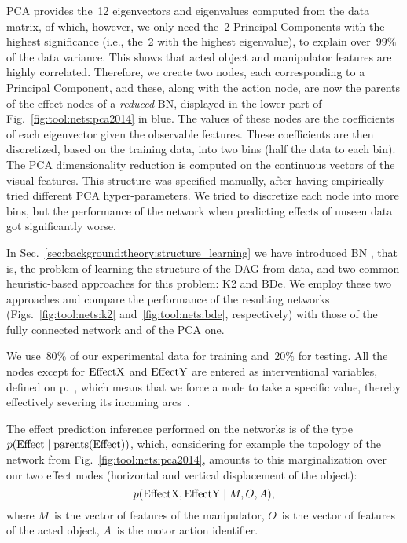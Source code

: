 \ac{PCA} provides the~12 eigenvectors and eigenvalues computed from the data matrix, of which, however, we only need the~2 Principal Components with the highest significance (i.e., the~2 with the highest eigenvalue), to explain over~$99\%$ of the data variance.
This shows that acted object and manipulator features are highly correlated.
Therefore, we create two nodes, each corresponding to a Principal Component, and these, along with the action node, are now the parents of the effect nodes of a \emph{reduced} \acl{BN}, displayed in the lower part of Fig.~\ref{fig:tool:nets:pca2014} in blue.
The values of these nodes are the coefficients of each eigenvector given the observable features.
These coefficients are then discretized, based on the training data, into two bins
(half the data to each bin).
The \ac{PCA} dimensionality reduction is computed on the continuous vectors of the visual features.
This structure was specified manually, after having empirically tried different \ac{PCA} hyper-parameters.
We tried to discretize each node into more bins, but the performance of the network when predicting effects of unseen data got significantly worse.

In Sec.~\ref{sec:background:theory:structure_learning} we have introduced \acl{BN} \StructureLearning{}, that is, the problem of learning the structure of the \ac{DAG} from data, and two common heuristic-based approaches for this problem: K2 and BDe.
We employ these two approaches and compare the performance of the resulting networks (Figs.~\ref{fig:tool:nets:k2} and~\ref{fig:tool:nets:bde}, respectively) with those of the fully connected network and of the \ac{PCA} one.

We use~$80\%$ of our experimental data for training and~$20\%$ for testing.
All the nodes except for $\text{EffectX}$ and $\text{EffectY}$ are entered as interventional variables, defined on p.~\pageref{para:interventional_vars}, which means that we force a node to take a specific value, thereby effectively severing its incoming arcs~\cite{murphy:2012:mlprob}.

The effect prediction inference performed on the networks is of the type $p(\text{Effect} \mid \operatorname{parents}(\text{Effect}))$, which, considering for example the topology of the network from Fig.~\ref{fig:tool:nets:pca2014}, amounts to this marginalization over our two effect nodes (horizontal and vertical displacement of the object):
\begin{equation} \label{eq:effect_query}
    p(\text{EffectX}, \text{EffectY} \mid M, O, A),
\end{equation}
where $M$~is the vector of features of the manipulator, $O$~is the vector of features of the acted object, $A$~is the motor action identifier.

